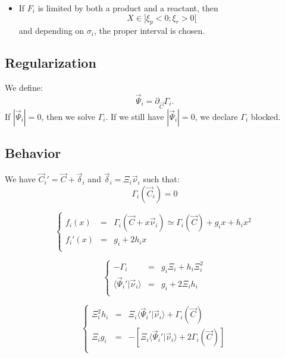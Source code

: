 \documentclass[aps,12pt]{revtex4}
\begin{document}
\begin{itemize}
\begin{itemize}
	\item If $F_i$ is limited by both a product and a reactant, then $$X\in\rbrack \xi_p < 0 ; \xi_r > 0 \lbrack$$
	and depending on $\sigma_i$, the proper interval is chosen.
	\end{itemize}
	
\end{itemize}



\subsection{Regularization}
We define:
\begin{equation}
\vec{\Psi}_i = \partial_{\vec{C}} \Gamma_i.
\end{equation}
If $|\vec{\Psi}_i|=0$, then we solve $\Gamma_i$. If we still have $|\vec{\Psi}_i|=0$, we declare $\Gamma_i$ blocked.

\subsection{Behavior}
We have $\vec{C}_i'=\vec{C} + \vec{\delta}_i$ and $\vec{\delta}_i = \Xi_i \vec{\nu}_i$ such that:
\begin{equation}
	\Gamma_i(\vec{C}_i) = 0
\end{equation}

\begin{equation}
\left\lbrace
\begin{array}{rcl}
	f_i(x) & = & \Gamma_i(\vec{C} + x \vec{\nu}_i) \simeq \Gamma_i(\vec{C}) + g_i x + h_i x^2\\
	f_i'(x) & = & g_i + 2 h_i x\\
\end{array}
\right.
\end{equation}

\begin{equation}
\left\lbrace
\begin{array}{rcl}
	-\Gamma_i & = & g_i \Xi_i + h_i \Xi_i^2\\
	\langle \vec{\Psi}_i' \vert \vec{\nu}_i \rangle & = & g_i + 2 \Xi_i h_i\\
\end{array}
\right.
\end{equation} 

\begin{equation}
\left\lbrace
\begin{array}{rcl}
	\Xi_i^2 h_i & = & \Xi_i \langle \vec{\Psi}_i' \vert \vec{\nu}_i \rangle + \Gamma_i(\vec{C})\\
	\Xi_i   g_i & = & -\left[\Xi_i \langle \vec{\Psi}_i' \vert \vec{\nu}_i \rangle  +2\Gamma_i(\vec{C})\right] \\
\end{array}
\right.
\end{equation}
 
\end{document}
